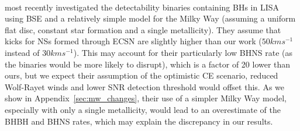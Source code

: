 \paragraph{\citet{Shao+2021}} most recently investigated the detectability binaries containing BHs in LISA using BSE and a relatively simple model for the Milky Way (assuming a uniform flat disc, constant star formation and a single metallicity). They assume that kicks for NSs formed through ECSN are slightly higher than our work ($50 \unit{km}{s^{-1}}$ instead of $30 \unit{km}{s^{-1}}$). This may account for their particularly low BHNS rate (as the binaries would be more likely to disrupt), which is a factor of 20 lower than ours, but we expect their assumption of the optimistic CE scenario, reduced Wolf-Rayet winds and lower SNR detection threshold would offset this. As we show in Appendix~\ref{sec:mw_changes}, their use of a simpler Milky Way model, especially with only a single metallicity, would lead to an overestimate of the BHBH and BHNS rates, which may explain the discrepancy in our results.